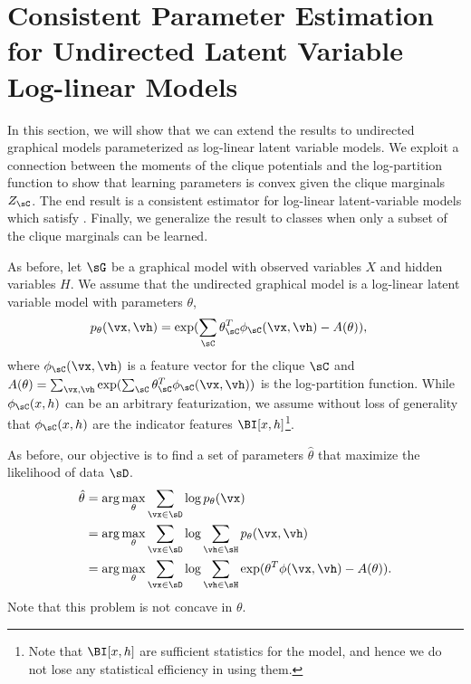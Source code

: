 \section{Consistent Parameter Estimation for Undirected Latent Variable Log-linear Models}
\label{sec:undirected}

In this section, we will show that we can extend the results to
  undirected graphical models parameterized as log-linear latent variable
  models.
We exploit a connection between the moments of the clique potentials and
  the log-partition function to show that learning parameters is convex
  given the clique marginals $Z_\sC$. 
The end result is a consistent estimator for log-linear
  latent-variable models which satisfy .
Finally, we generalize the result to classes when only a subset of the
  clique marginals can be learned.

As before, let $\sG$ be a graphical model with observed variables $X$ and hidden variables $H$.
We assume that the undirected graphical model is a log-linear latent
  variable model with parameters $\theta$,
\begin{align*}
  p_\theta(\vx, \vh) &= \exp( \sum_\sC \theta_\sC^T \phi_\sC(\vx,\vh) - A(\theta) ),
\end{align*}
where $\phi_\sC(\vx,\vh)$ is a feature vector for the clique $\sC$ and
  $A(\theta) = \sum_{\vx, \vh}  \exp( \sum_\sC \theta_\sC^T \phi_\sC(\vx,\vh) )$ is the
  log-partition function.
While $\phi_\sC(x,h)$ can be an arbitrary featurization, we assume
  without loss of generality that $\phi_\sC(x,h)$ are the indicator
  features $\BI[x,h]$\footnote{Note that $\BI[x,h]$ are sufficient
  statistics for the model, and hence we do not lose any statistical
  efficiency in using them.}.

As before, our objective is to find a set of parameters $\hat \theta$
  that maximize the likelihood of data $\sD$.
\begin{align}
  \hat \theta 
      &= \arg\max_{\theta} \sum_{\vx \in \sD} \log p_\theta(\vx) \nonumber \\
      &= \arg\max_{\theta} \sum_{\vx \in \sD} \log \sum_{\vh \in \sH} p_\theta(\vx,\vh) \nonumber \\
      &= \arg\max_{\theta} \sum_{\vx \in \sD} \log \sum_{\vh \in \sH} \exp( \theta^T\phi(\vx,\vh) - A(\theta) ). \label{eqn:obj-ml}
\end{align}
Note that this problem is not concave in $\theta$. 


